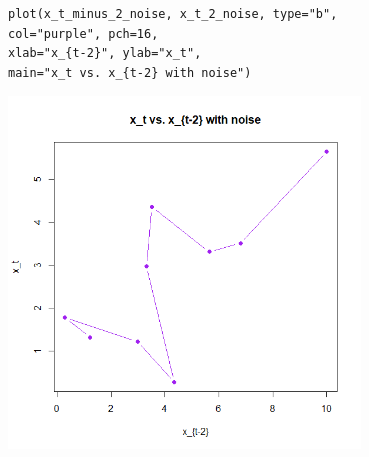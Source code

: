\documentclass[12pt]{article}
\begin{document}
\begin{enumerate}
\begin{enumerate}
\begin{enumerate}
\begin{verbatim}
plot(x_t_minus_2_noise, x_t_2_noise, type="b", 
col="purple", pch=16, 
xlab="x_{t-2}", ylab="x_t", 
main="x_t vs. x_{t-2} with noise")
\end{verbatim}
            \begin{center}
                \includegraphics[width=0.7\textwidth]{Rplot09.png}
            \end{center}
        \end{enumerate}

    \end{enumerate}


\end{enumerate}
\end{document}
